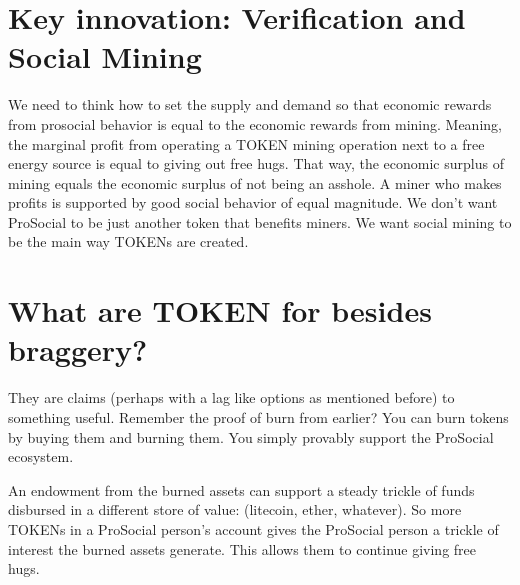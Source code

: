 \section*{Key innovation: Verification and Social Mining}

We need to think how to set the supply and demand so that economic rewards from prosocial behavior is equal to the economic rewards from mining. Meaning, the marginal profit from operating a TOKEN mining operation next to a free energy source is equal to giving out free hugs. That way, the economic surplus of mining equals the economic surplus of not being an asshole. A miner who makes profits is supported by good social behavior of equal magnitude. We don't want ProSocial to be just another token that benefits miners. We want social mining to be the main way TOKENs are created.

\section*{What are TOKEN for besides braggery?}
They are claims (perhaps with a lag like options as mentioned before) to something useful. Remember the proof of burn from earlier? You can burn tokens by buying them and burning them. You simply provably support the ProSocial ecosystem. 

An endowment from the burned assets can support a steady trickle of funds disbursed in a different store of value: (litecoin, ether, whatever). So more TOKENs in a ProSocial person's account gives the ProSocial person a trickle of interest the burned assets generate. This allows them to continue giving free hugs.

\newpage
\newpage

